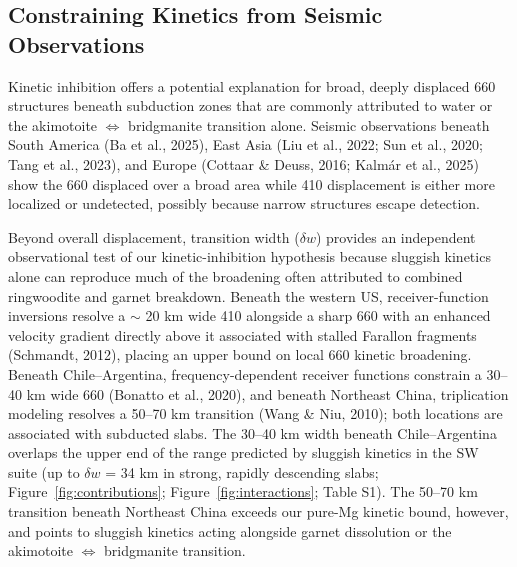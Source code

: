 \documentclass[draft,linenumbers]{agujournal2019}
\begin{document}
\subsection{Constraining Kinetics from Seismic
Observations}\label{sec:constraining-kinetics-from-seismic-observations}

Kinetic inhibition offers a potential explanation for broad, deeply
displaced 660 structures beneath subduction zones that are commonly
attributed to water or the akimotoite \(\Leftrightarrow\) bridgmanite
transition alone. Seismic observations beneath South America (Ba et al.,
2025), East Asia (Liu et al., 2022; Sun et al., 2020; Tang et al.,
2023), and Europe (Cottaar \& Deuss, 2016; Kalmár et al., 2025) show the
660 displaced over a broad area while 410 displacement is either more
localized or undetected, possibly because narrow structures escape
detection.

Beyond overall displacement, transition width (\(\delta w\)) provides an
independent observational test of our kinetic-inhibition hypothesis
because sluggish kinetics alone can reproduce much of the broadening
often attributed to combined ringwoodite and garnet breakdown. Beneath
the western US, receiver-function inversions resolve a \(\sim\) 20 km
wide 410 alongside a sharp 660 with an enhanced velocity gradient
directly above it associated with stalled Farallon fragments (Schmandt,
2012), placing an upper bound on local 660 kinetic broadening. Beneath
Chile--Argentina, frequency-dependent receiver functions constrain a
30--40 km wide 660 (Bonatto et al., 2020), and beneath Northeast China,
triplication modeling resolves a 50--70 km transition (Wang \& Niu,
2010); both locations are associated with subducted slabs. The 30--40 km
width beneath Chile--Argentina overlaps the upper end of the range
predicted by sluggish kinetics in the SW suite (up to \(\delta w\) = 34
km in strong, rapidly descending slabs; Figure~\ref{fig:contributions};
Figure~\ref{fig:interactions}; Table S1). The 50--70 km transition
beneath Northeast China exceeds our pure-Mg kinetic bound, however, and
points to sluggish kinetics acting alongside garnet dissolution or the
akimotoite \(\Leftrightarrow\) bridgmanite transition.
\end{document}
